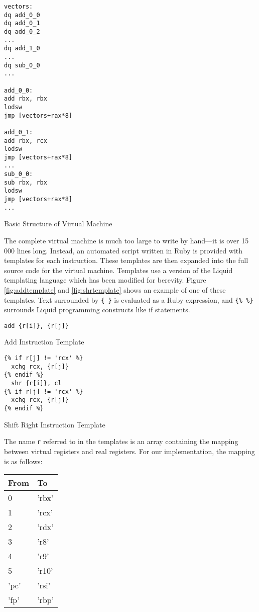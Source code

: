 		\begin{myfigure}
			\begin{lstlisting}
vectors:
dq add_0_0
dq add_0_1
dq add_0_2
...
dq add_1_0
...
dq sub_0_0
...

add_0_0:
add rbx, rbx
lodsw
jmp [vectors+rax*8]

add_0_1:
add rbx, rcx
lodsw
jmp [vectors+rax*8]
...
sub_0_0:
sub rbx, rbx
lodsw
jmp [vectors+rax*8]
...
			\end{lstlisting}
			\caption{Basic Structure of Virtual Machine}
			\label{fig:vmstructure}
		\end{myfigure}
		
		The complete virtual machine is much too large to write by hand---it is over 15 000 lines long. Instead, an automated script written in Ruby is provided with templates for each instruction. These templates are then expanded into the full source code for the virtual machine. Templates use a version of the Liquid templating language which has been modified for berevity. Figure \ref{fig:addtemplate} and \ref{fig:shrtemplate} shows an example of one of these templates. Text surrounded by \texttt{\{ \}} is evaluated as a Ruby expression, and \texttt{\{\% \%\}} surrounds Liquid programming constructs like if statements.
		
		\begin{doublefig}
			\begin{halffig}
				\begin{lstlisting}
add {r[i]}, {r[j]}
				\end{lstlisting}
				\caption{Add Instruction Template}
				\label{fig:addtemplate}
			\end{halffig}
			\begin{halffig}
				\begin{lstlisting}
{% if r[j] != 'rcx' %}
  xchg rcx, {r[j]}
{% endif %}
  shr {r[i]}, cl
{% if r[j] != 'rcx' %}
  xchg rcx, {r[j]}
{% endif %}
				\end{lstlisting}
				\caption{Shift Right Instruction Template}
				\label{fig:shrtemplate}
			\end{halffig}
		\end{doublefig}
		
		The name \texttt{r} referred to in the templates is an array containing the mapping between virtual registers and real registers. For our implementation, the mapping is as follows:
		
		\begin{tabular}{|l|l|}
			\hline
			From & To \\
			\hline
			0 & 'rbx' \\
			\hline
			1 & 'rcx' \\
			\hline
			2 & 'rdx' \\
			\hline
			3 & 'r8' \\
			\hline
			4 & 'r9' \\
			\hline
			5 & 'r10' \\
			\hline
			'pc' & 'rsi' \\
			\hline
			'fp' & 'rbp' \\ 
			\hline
		\end{tabular}
		

